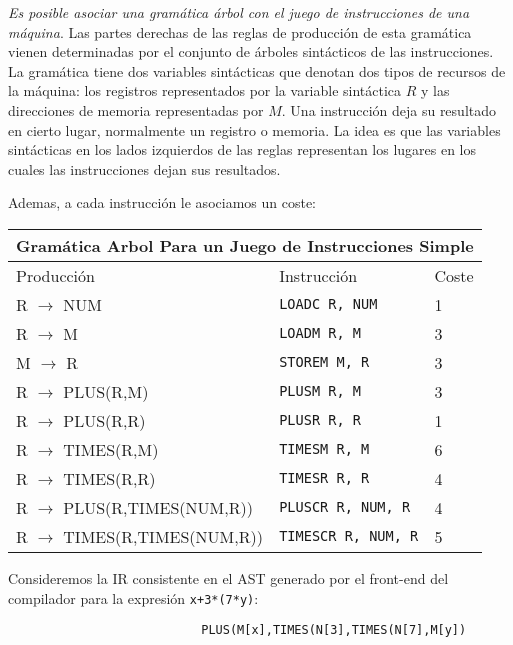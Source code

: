 \emph{Es posible asociar 
una gramática árbol con 
el juego de instrucciones de una máquina}. 
Las partes derechas de las reglas de producción de esta gramática vienen determinadas
por el conjunto de árboles sintácticos de las instrucciones. 
La gramática tiene dos variables sintácticas 
que denotan dos tipos de recursos de la máquina: los registros
representados por la variable sintáctica $R$ y las direcciones de memoria 
representadas por $M.$ 
Una instrucción deja su resultado en cierto lugar, normalmente un registro o
memoria. La idea es que las variables sintácticas en los lados izquierdos
de las reglas representan los lugares
en los cuales las instrucciones dejan sus resultados.

Ademas, a cada instrucción le asociamos un coste:

\begin{center}
\begin{tabular}{|l|p{4.25cm}|l|}
\hline
\multicolumn{3}{|c|}{Gramática Arbol Para un Juego de Instrucciones Simple}\\
\hline
 Producción                                &   Instrucción           & Coste \\
\hline
 R $\rightarrow$ NUM                  &   \verb|LOADC R, NUM|    &   1   \\
\hline
 R $\rightarrow$ M                    &   \verb|LOADM R, M|     &   3\\
\hline
 M $\rightarrow$ R                    &   \verb|STOREM M, R|     &   3\\
\hline
 R $\rightarrow$ PLUS(R,M)            &   \verb|PLUSM R, M|     &   3\\
\hline
 R $\rightarrow$ PLUS(R,R)            &   \verb|PLUSR R, R|     &  1\\
\hline
  R $\rightarrow$ TIMES(R,M)          &   \verb|TIMESM R, M|    &   6\\
\hline
 R $\rightarrow$ TIMES(R,R)           &   \verb|TIMESR R, R|   &  4\\
\hline
 R $\rightarrow$ PLUS(R,TIMES(NUM,R)) & \verb|PLUSCR R, NUM, R| & 4\\
\hline
 R $\rightarrow$ TIMES(R,TIMES(NUM,R)) &  \verb|TIMESCR R, NUM, R| & 5\\
\hline
\end{tabular}
\end{center}

Consideremos la IR consistente en el AST generado por el front-end del compilador
para la expresión \verb|x+3*(7*y)|:

\begin{verbatim}
                           PLUS(M[x],TIMES(N[3],TIMES(N[7],M[y])
\end{verbatim}

